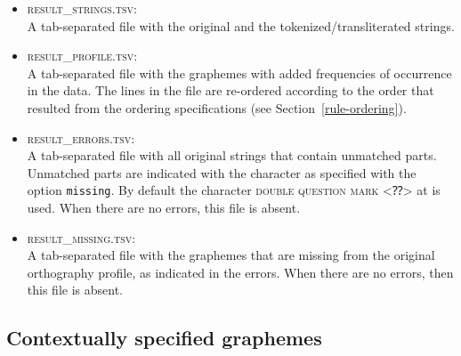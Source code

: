 \begin{itemize}
  
   \item \textsc{result\_strings.tsv}:\\ A tab-separated file with the original
         and the tokenized/transliterated strings.

   \item \textsc{result\_profile.tsv}:\\ A tab-separated file with the
         graphemes with added frequencies of occurrence in the data. The lines
         in the file are re-ordered according to the order that resulted from the
         ordering specifications (see Section~\ref{rule-ordering}).

   \item \textsc{result\_errors.tsv}:\\ A tab-separated file with all original
         strings that contain unmatched parts. Unmatched parts are indicated
         with the character as specified with the option \texttt{missing}. By
         default the character \textsc{double question mark} <⁇> at
          is used. When there are no errors, this file is 
         absent.

    \item \textsc{result\_missing.tsv}:\\ A tab-separated file with the graphemes
          that are missing from the original orthography profile, as indicated in
          the errors. When there are no errors, then this file is absent.
          
\end{itemize}

\subsection*{Contextually specified graphemes}
\label{contextual-specification}

